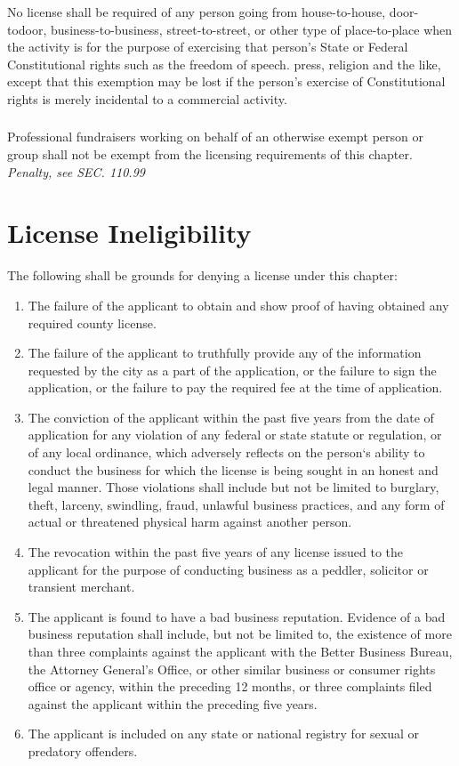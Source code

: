\subsubsection{}
No license shall be required of any person going from house-to-house, door-todoor, business-to-business, street-to-street, or other type of place-to-place when the activity is for the purpose of exercising that person's State or Federal Constitutional rights such as the freedom of speech. press, religion and the like, except that this exemption may be lost if the person's exercise of Constitutional rights is merely incidental to a commercial activity.
\subsubsection{}
Professional fundraisers working on behalf of an otherwise exempt person or group shall not be exempt from the licensing requirements of this chapter.\\
\emph{Penalty, see SEC. 110.99}

\section{License Ineligibility}
The following shall be grounds for denying a license under this chapter:
\begin{enumerate}[{\indent}A)]
    \item The failure of the applicant to obtain and show proof of having obtained any required county license.
    \item The failure of the applicant to truthfully provide any of the information requested by the city as a part of the application, or the failure to sign the application, or the failure to pay the required fee at the time of application.
    \item The conviction of the applicant within the past five years from the date of application for any violation of any federal or state statute or regulation, or of any local ordinance, which adversely reflects on the person‘s ability to conduct the business for which the license is being sought in an honest and legal manner. Those violations shall include but not be limited to burglary, theft, larceny, swindling, fraud, unlawful business practices, and any form of actual or threatened physical harm against another person.
    \item The revocation within the past five years of any license issued to the applicant for the purpose of conducting business as a peddler, solicitor or transient merchant.
    \item The applicant is found to have a bad business reputation. Evidence of a bad business reputation shall include, but not be limited to, the existence of more than three complaints against the applicant with the Better Business Bureau, the Attorney General’s Office, or other similar business or consumer rights office or agency, within the preceding 12 months, or three complaints filed against the applicant within the preceding five years.
    \item The applicant is included on any state or national registry for sexual or predatory offenders.
\end{enumerate}

